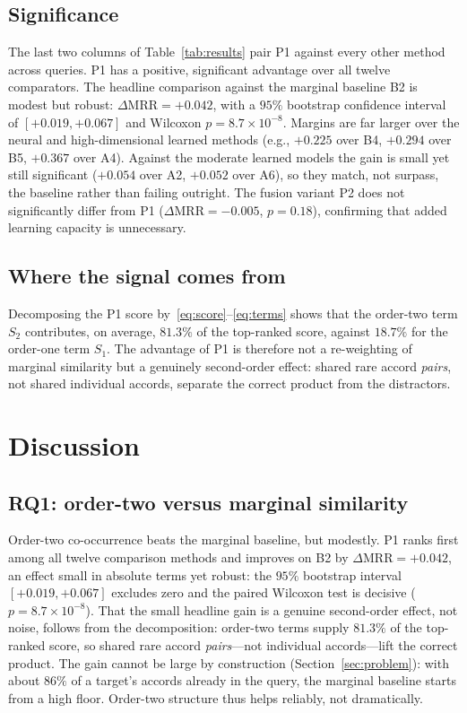 \documentclass[conference]{IEEEtran}
\begin{document}
\subsection{Significance}
The last two columns of Table~\ref{tab:results} pair P1 against every other method across
queries. P1 has a
positive, significant advantage over all twelve comparators. The headline comparison
against the marginal baseline B2 is modest but robust: $\Delta\mathrm{MRR}=+0.042$, with a
$95\%$ bootstrap confidence interval of $[+0.019,+0.067]$ and Wilcoxon
$p=8.7\times10^{-8}$. Margins are far larger over the neural and high-dimensional learned
methods (e.g., $+0.225$ over B4, $+0.294$ over B5, $+0.367$ over A4). Against the moderate
learned models the gain is small yet still significant ($+0.054$ over A2, $+0.052$ over
A6), so they match, not surpass, the baseline rather than failing outright. The fusion
variant P2 does not significantly differ from P1
($\Delta\mathrm{MRR}=-0.005$, $p=0.18$), confirming that added learning capacity is
unnecessary.

\subsection{Where the signal comes from}
Decomposing the P1 score by~\eqref{eq:score}--\eqref{eq:terms} shows that the order-two
term $S_2$ contributes, on average, $81.3\%$ of the top-ranked score, against $18.7\%$ for
the order-one term $S_1$. The advantage of P1 is therefore not a re-weighting of marginal
similarity but a genuinely second-order effect: shared rare accord \emph{pairs}, not
shared individual accords, separate the correct product from the distractors.

\section{Discussion}\label{sec:discussion}

\subsection{RQ1: order-two versus marginal similarity}
Order-two co-occurrence beats the marginal baseline, but modestly. P1 ranks first among
all twelve comparison methods and improves on B2 by $\Delta\mathrm{MRR}=+0.042$, an effect
small in absolute terms yet robust: the $95\%$ bootstrap interval $[+0.019,+0.067]$
excludes zero and the paired Wilcoxon test is decisive ($p=8.7\times10^{-8}$). That the
small headline gain is a genuine second-order effect, not noise, follows from the
decomposition: order-two terms supply $81.3\%$ of the top-ranked score, so shared rare
accord \emph{pairs}---not individual accords---lift the correct product. The gain cannot be
large by construction (Section~\ref{sec:problem}): with about $86\%$ of a target's accords
already in the query, the marginal baseline starts from a high floor. Order-two structure
thus helps reliably, not dramatically.
\end{document}
